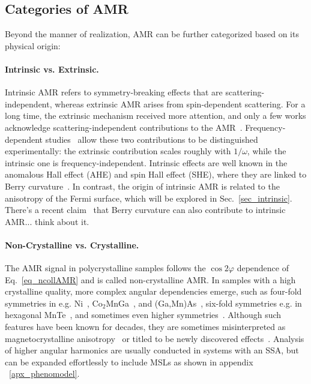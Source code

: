 \documentclass[prb,showpacs,amsmath,amssymb,superscriptaddress,twocolumn,floatfix]{revtex4-1}
\begin{document}
\subsection{Categories of AMR}

Beyond the manner of realization, AMR can be further categorized based on its physical origin:

\paragraph{Intrinsic vs. Extrinsic.} Intrinsic AMR refers to symmetry-breaking effects that are scattering-independent, whereas extrinsic AMR arises from spin-dependent scattering. For a long time, the extrinsic mechanism received more attention, and only a few works acknowledge scattering-independent contributions to the AMR~\cite{Kato:2008, Velev:2005, Zeng:2020, Kato:2007, Nadvordnik:2021, Park:2021}. Frequency-dependent studies~\cite{Nadvordnik:2021, Park:2021} allow these two contributions to be distinguished experimentally: the extrinsic contribution scales roughly with $1/\omega$, while the intrinsic one is frequency-independent. Intrinsic effects are well known in the anomalous Hall effect (AHE) and spin Hall effect (SHE), where they are linked to Berry curvature~\cite{Nagaosa:2010, Zhang:2017}. In contrast, the origin of intrinsic AMR is related to the anisotropy of the Fermi surface, which will be explored in Sec.~\ref{sec_intrinsic}.
{\color{red} There's a recent claim~\cite{Dong:2025_a} that Berry curvature
can also contribute to intrinsic AMR... think about it.}

\paragraph{Non-Crystalline vs. Crystalline.} The AMR signal in polycrystalline samples follows the $\cos 2\varphi$ dependence of Eq.~\ref{eq_ncollAMR} and is called non-crystalline AMR. In samples with a high crystalline quality, more complex angular dependencies emerge, such as four-fold symmetries in e.g. Ni~\cite{Doring:1938}, Co$_2$MnGa~\cite{Sato:2019,Ritzinger:2021}, and (Ga,Mn)As~\cite{DeRanieri:2008}, six-fold symmetries e.g. in hexagonal MnTe~\cite{Kriegner:2017, Gonzalez-Betancourt:2024}, and sometimes even higher symmetries~\cite{Gonzalez-Betancourt:2024, NamHai:2012}. Although such features have been known for decades, they are sometimes misinterpreted as magnetocrystalline anisotropy~\cite{Ritzinger:2023} or titled to be newly discovered effects~\cite{Dong:2023}. Analysis of higher angular harmonics are usually conducted in systems with an SSA, but can be expanded effortlessly to include MSLs as shown in appendix ~\ref{apx_phenomodel}.
\end{document}
